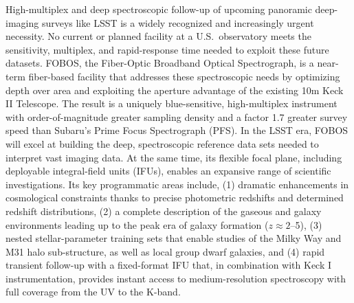 \documentclass[oneside,12pt]{amsart}
\begin{document}
\noindent High-multiplex and deep spectroscopic follow-up of upcoming
panoramic deep-imaging surveys like LSST is a widely recognized and
increasingly urgent necessity. No current or planned facility at a
U.S.~observatory meets the sensitivity, multiplex, and rapid-response
time needed to exploit these future datasets. FOBOS, the Fiber-Optic
Broadband Optical Spectrograph, is a near-term fiber-based facility that
addresses these spectroscopic needs by optimizing depth over area and
exploiting the aperture advantage of the existing 10m Keck II Telescope.
The result is a uniquely blue-sensitive, high-multiplex instrument with
order-of-magnitude greater sampling density and a factor 1.7 greater
survey speed than Subaru's Prime Focus Spectrograph (PFS). In the LSST
era, FOBOS will excel at building the deep, spectroscopic reference data
sets needed to interpret vast imaging data. At the same time, its
flexible focal plane, including deployable integral-field units (IFUs),
enables an expansive range of scientific investigations. Its key
programmatic areas include, (1) dramatic enhancements in cosmological
constraints thanks to precise photometric redshifts and determined
redshift distributions, (2) a complete description of the gaseous and
galaxy environments leading up to the peak era of galaxy formation ($z
\approx 2$--5), (3) nested stellar-parameter training sets that enable
studies of the Milky Way and M31 halo sub-structure, as well as local
group dwarf galaxies, and (4) rapid transient follow-up with a
fixed-format IFU that, in combination with Keck I instrumentation,
provides instant access to medium-resolution spectroscopy with full
coverage from the UV to the K-band.

\pagebreak















\clearpage
\begin{multicols}{2}
\scriptsize


\end{multicols}

\end{document}
